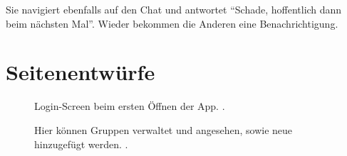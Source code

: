 \documentclass[parskip=full,11pt]{scrartcl}
\begin{document}
{Sie navigiert ebenfalls auf den Chat und antwortet \enquote{Schade, hoffentlich dann beim
nächsten Mal}.}
{Wieder bekommen die Anderen eine Benachrichtigung.}


\pagebreak
\appendix

\section{Seitenentwürfe}

\begin{figure}[hb]
	\caption{\label{fig:menu}
		Login-Screen beim ersten Öffnen der App.
		 .
	}
\end{figure}

\begin{figure}[hb]
	\caption{\label{fig:groups}
		Hier können Gruppen verwaltet und angesehen, sowie neue hinzugefügt werden.
		.
	}
\end{figure}
\end{document}
